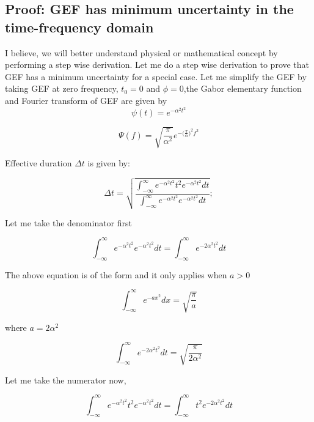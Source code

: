 \subsection{Proof: GEF has minimum uncertainty in the time-frequency domain}

I believe, we will better understand physical or mathematical concept by performing a step wise derivation. Let me do a step wise derivation to prove that GEF has a minimum uncertainty for a special case. Let me simplify the GEF by taking GEF at zero frequency, $t_0 = 0$ and $\phi = 0$,the Gabor elementary function and Fourier transform of GEF are given by
\begin{equation*}
\psi(t) = e^{-\alpha ^2 t^2}
\end{equation*}

\begin{equation*}
\Psi(f) = \sqrt{\frac{\pi}{\alpha ^2}} e^{-{(\frac{\pi} {\alpha}})^2 f^2}
\end{equation*}

Effective duration $\Delta t$ is given by:

\begin{equation*}
\Delta t = \sqrt{\frac{\int_{-\infty}^{\infty}{e^{-\alpha ^2 t^2} t^2  e^{-\alpha ^2 t^2} dt}}{\int_{-\infty}^{\infty}{e^{-\alpha ^2 t^2} e^{-\alpha ^2 t^2}dt}}} ;
\end{equation*}

Let me take the denominator first

\begin{equation*}
\int_{-\infty}^{\infty}{e^{-\alpha ^2 t^2} e^{-\alpha ^2 t^2}dt} =\int_{-\infty}^{\infty}{e^{-2\alpha ^2 t^2} dt}
\end{equation*}

The above equation is of the form and it only applies when $a > 0$

\begin{equation*}
\int_{-\infty}^{\infty}e^{-ax^2 }dx = \sqrt{\frac{\pi}{a}}
\end{equation*}

where $a = 2\alpha ^ 2$

\begin{equation*}
\int_{-\infty}^{\infty}{e^{-2\alpha ^2 t^2} dt} = \sqrt{\frac{\pi}{2\alpha ^ 2}}
\end{equation*}

Let me take the numerator now,

\begin{equation*}
\int_{-\infty}^{\infty}{e^{-\alpha ^2 t^2} t^2 e^{-\alpha ^2 t^2}dt} =\int_{-\infty}^{\infty}{t^2 e^{-2\alpha ^2 t^2} dt}
\end{equation*}

